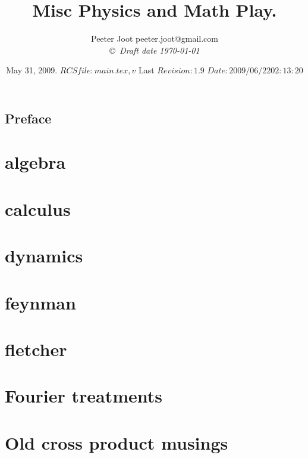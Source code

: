 \documentclass[12pt,leqno]{book}
\title{Misc Physics and Math Play.}
\author{Peeter Joot  \quad peeter.joot@gmail.com \\
{\small\em \copyright \  Draft date \today }}
\date{ May 31, 2009.  $RCSfile: main.tex,v $ Last $Revision: 1.9 $ $Date: 2009/06/22 02:13:20 $ }
\begin{document}
\maketitle
\tableofcontents
\listoffigures
\listoftables
\chapter*{Preface}\normalsize
\pagestyle{plain}

%
\pagestyle{headings}


\part{algebra}





\part{calculus}





\part{dynamics}


\part{feynman}


\part{fletcher}


\part{Fourier treatments}


\part{Old cross product musings}


\end{document}

